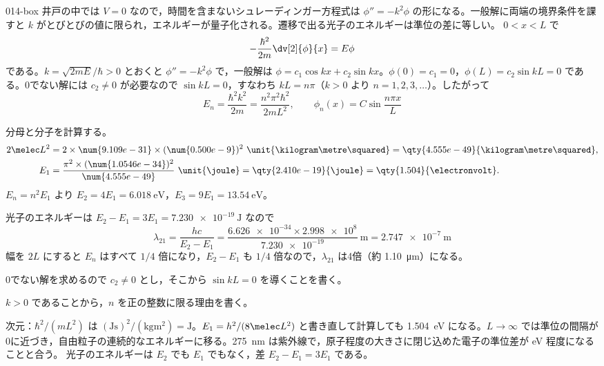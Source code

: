 \documentclass[uplatex,dvipdfmx,a4paper,11pt]{jsarticle}
\begin{document}
\begin{kaisetsu}{014-box}
\houshin 井戸の中では $V=0$ なので，時間を含まないシュレーディンガー方程式は $\phi''=-k^{2}\phi$ の形になる。一般解に両端の境界条件を課すと $k$ がとびとびの値に限られ，エネルギーが量子化される。遷移で出る光子のエネルギーは準位の差に等しい。
\keisan
{} $0<x<L$ で
\[ -\frac{\hbar^{2}}{2m}\dv[2]{\phi}{x}=E\phi \]
である。$k=\sqrt{2mE}/\hbar>0$ とおくと $\phi''=-k^{2}\phi$ で，一般解は $\phi=c_{1}\cos kx+c_{2}\sin kx$。$\phi(0)=c_{1}=0$，$\phi(L)=c_{2}\sin kL=0$ である。0でない解には $c_{2}\neq0$ が必要なので $\sin kL=0$，すなわち $kL=n\pi$（$k>0$ より $n=1,2,3,\dots$）。したがって
\[ E_{n}=\frac{\hbar^{2}k^{2}}{2m}=\frac{n^{2}\pi^{2}\hbar^{2}}{2mL^{2}},\qquad \phi_{n}(x)=C\sin\frac{n\pi x}{L} \]

 分母と分子を計算する。
\begin{align*}
  2\melec L^{2}&=2\times\num{9.109e-31}\times(\num{0.500e-9})^{2}\ \unit{\kilogram\metre\squared}=\qty{4.555e-49}{\kilogram\metre\squared},\\
  E_{1}&=\frac{\pi^{2}\times(\num{1.0546e-34})^{2}}{\num{4.555e-49}}\ \unit{\joule}=\qty{2.410e-19}{\joule}=\qty{1.504}{\electronvolt}.
\end{align*}
$E_{n}=n^{2}E_{1}$ より $E_{2}=4E_{1}=\qty{6.018}{\electronvolt}$，$E_{3}=9E_{1}=\qty{13.54}{\electronvolt}$。

 光子のエネルギーは $E_{2}-E_{1}=3E_{1}=\qty{7.230e-19}{\joule}$ なので
\[ \lambda_{21}=\frac{hc}{E_{2}-E_{1}}=\frac{\num{6.626e-34}\times\num{2.998e8}}{\num{7.230e-19}}\ \unit{\metre}=\qty{2.747e-7}{\metre} \]
幅を $2L$ にすると $E_{n}$ はすべて $1/4$ 倍になり，$E_{2}-E_{1}$ も $1/4$ 倍なので，$\lambda_{21}$ は4倍（約 \qty{1.10}{\micro\metre}）になる。
\begin{ronten}
  \item {} 0でない解を求めるので $c_{2}\ne 0$ とし，そこから $\sin kL=0$ を導くことを書く。
  \item {} $k>0$ であることから，$n$ を正の整数に限る理由を書く。
\end{ronten}
\kenzan 次元：$\hbar^{2}/(mL^{2})$ は $(\unit{\joule\second})^{2}/(\unit{\kilogram\metre\squared})=\unit{\joule}$。$E_{1}=h^{2}/(8\melec L^{2})$ と書き直して計算しても \qty{1.504}{\electronvolt} になる。$L\to\infty$ では準位の間隔が0に近づき，自由粒子の連続的なエネルギーに移る。\qty{275}{\nano\metre} は紫外線で，原子程度の大きさに閉じ込めた電子の準位差が \unit{\electronvolt} 程度になることと合う。
\tsumazuki 光子のエネルギーは $E_{2}$ でも $E_{1}$ でもなく，差 $E_{2}-E_{1}=3E_{1}$ である。
\end{kaisetsu}
\end{document}
